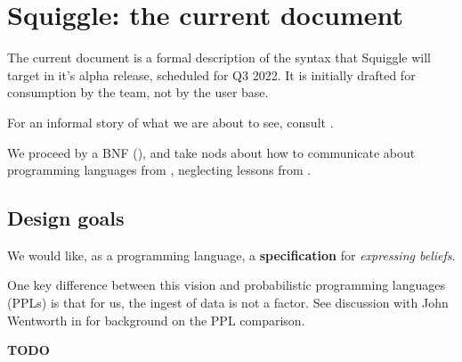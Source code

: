 \documentclass[../main.tex]{subfiles}
\begin{document}
\section{Squiggle: the current document}

The current document is a formal description of the syntax that Squiggle will target in it's alpha release, scheduled for Q3 2022. It is initially drafted for consumption by the team, not by the user base.

For an informal story of what we are about to see, consult \cite{@SqgCodePlan}.

We proceed by a BNF (\cite{@BNFWiki}), and take nods about how to communicate about programming languages from \cite{@CraftingInterpreters, Appendix I}, neglecting lessons from \cite{@PFPL}.

\subsection{Design goals}

We would like, as a programming language, a \textbf{specification} for \textit{expressing beliefs}.

One key difference between this vision and probabilistic programming languages (PPLs) is that for us, the ingest of data is not a factor. See discussion with John Wentworth in \cite{@SqgSequence} for background on the PPL comparison.

\textbf{TODO}
\end{document}
